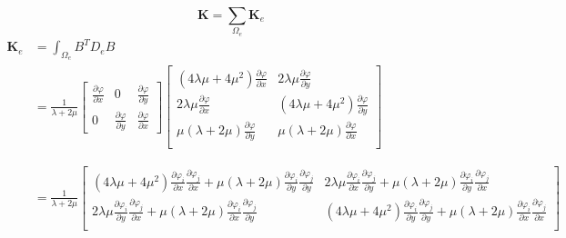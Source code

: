 \documentclass[12pt]{article}
\begin{document}
%
\begin{equation}	\label{eq48b}
\mathbf{K}=\sum_{\Omega_e}\mathbf{K}_e
\end{equation}
%
\begin{equation}	\label{eq49b}
\begin{split}
\mathbf{K}_e&=\int_{\Omega_e}B^TD_eB	\\
&= \frac{1}{\lambda+2\mu}
 \left[
\begin{array}{ccc}
\frac{\partial \varphi}{\partial x} & 0  &   \frac{\partial \varphi}{\partial y}			\\
0 &\frac{\partial \varphi}{\partial y} 	& \frac{\partial \varphi}{\partial x}			
\end{array}
\right]
%
\left[
\begin{array}{cc}
(4\lambda\mu+4\mu^2)\frac{\partial \varphi}{\partial x} & 2\lambda\mu\frac{\partial \varphi}{\partial y}  			\\
2\lambda\mu\frac{\partial \varphi}{\partial x} &	(4\lambda\mu+4\mu^2)\frac{\partial \varphi}{\partial y} 			\\
\mu(\lambda+2\mu) \frac{\partial \varphi}{\partial y} & \mu(\lambda+2\mu) \frac{\partial \varphi}{\partial x}  			\\
\end{array}
\right]	\\	\\	\\
%
&=\frac{1}{\lambda+2\mu}
\left[
\begin{array}{cc}
(4\lambda\mu+4\mu^2)\frac{\partial \varphi_i}{\partial x}\frac{\partial \varphi_j}{\partial x}+\mu(\lambda+2\mu)\frac{\partial \varphi_i}{\partial y}\frac{\partial \varphi_j}{\partial y} &2 \lambda\mu\frac{\partial \varphi_i}{\partial x}\frac{\partial \varphi_j}{\partial y} + \mu(\lambda+2\mu)\frac{\partial \varphi_i}{\partial y}\frac{\partial \varphi_j}{\partial x}  	\\
%
2\lambda\mu\frac{\partial \varphi_i}{\partial y}\frac{\partial \varphi_j}{\partial x}+\mu(\lambda+2\mu)\frac{\partial \varphi_i}{\partial x}\frac{\partial \varphi_j}{\partial y}   & (4\lambda\mu+4\mu^2)\frac{\partial \varphi_i}{\partial y}\frac{\partial \varphi_j}{\partial y}+\mu(\lambda+2\mu)\frac{\partial \varphi_i}{\partial x}\frac{\partial \varphi_j}{\partial x}  \\
\end{array}
\right]	
\end{split}
\end{equation}
\end{document}
